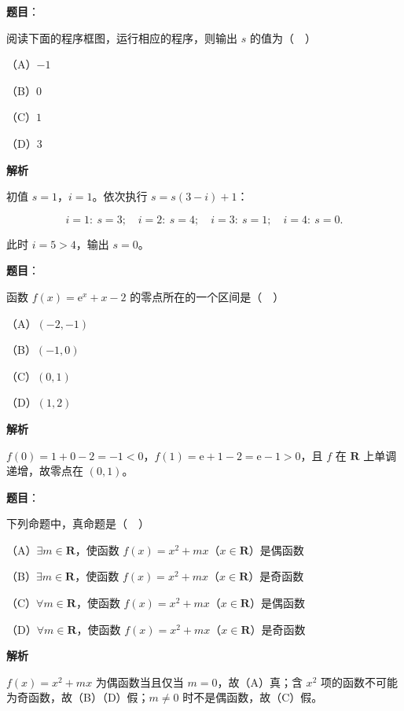 \begin{answer}

\textbf{题目}：

阅读下面的程序框图，运行相应的程序，则输出 $s$ 的值为（　）
\nopagebreak[4]
\begin{center}\end{center}
\nopagebreak[4]
（A）$-1$

（B）$0$

（C）$1$

（D）$3$

\textbf{解析}

初值 $s=1$，$i=1$。依次执行 $s=s(3-i)+1$：

\nopagebreak[4]
\[i=1:\ s=3;\quad i=2:\ s=4;\quad i=3:\ s=1;\quad i=4:\ s=0.\]

此时 $i=5>4$，输出 $s=0$。


\end{answer}
\begin{answer}

\textbf{题目}：

函数 $f(x)=\mathrm e^x+x-2$ 的零点所在的一个区间是（　）

（A）$(-2,-1)$

（B）$(-1,0)$

（C）$(0,1)$

（D）$(1,2)$

\textbf{解析}

$f(0)=1+0-2=-1<0$，$f(1)=\mathrm e+1-2=\mathrm e-1>0$，且 $f$ 在 $\mathbf R$ 上单调递增，故零点在 $(0,1)$。


\end{answer}
\begin{answer}

\textbf{题目}：

下列命题中，真命题是（　）

（A）$\exists m\in\mathbf R$，使函数 $f(x)=x^2+mx$（$x\in\mathbf R$）是偶函数

（B）$\exists m\in\mathbf R$，使函数 $f(x)=x^2+mx$（$x\in\mathbf R$）是奇函数

（C）$\forall m\in\mathbf R$，使函数 $f(x)=x^2+mx$（$x\in\mathbf R$）是偶函数

（D）$\forall m\in\mathbf R$，使函数 $f(x)=x^2+mx$（$x\in\mathbf R$）是奇函数

\textbf{解析}

$f(x)=x^2+mx$ 为偶函数当且仅当 $m=0$，故（A）真；含 $x^2$ 项的函数不可能为奇函数，故（B）（D）假；$m\neq0$ 时不是偶函数，故（C）假。


\end{answer}
